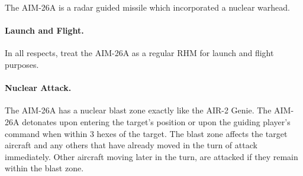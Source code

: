 \begin{advancedrules}
The AIM-26A is a radar guided missile which incorporated a nuclear warhead.

\paragraph{Launch and Flight.} In all respects, treat the AIM-26A as a regular RHM for launch and flight purposes.

\paragraph{Nuclear Attack.} The AIM-26A has a nuclear blast zone exactly like the AIR-2 Genie. The AIM-26A detonates upon entering the target's position or upon the guiding player's command when within 3 hexes of the target. The blast zone affects the target aircraft and any others that have already moved in the turn of attack immediately. Other aircraft moving later in the turn, are attacked if they remain within the blast zone.

\end{advancedrules}

